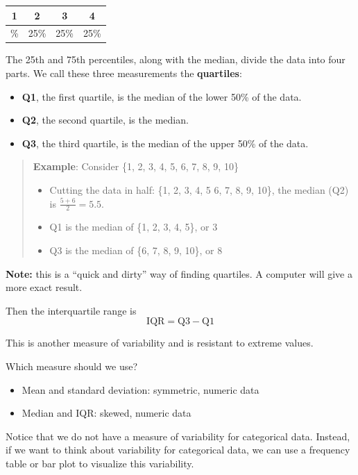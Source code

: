 \documentclass[
]{book}
\providecommand{\tightlist}{%
  \setlength{\itemsep}{0pt}\setlength{\parskip}{0pt}}
\begin{document}
\begin{longtable}[]{@{}cccc@{}}
\toprule\noalign{}
1 & 2 & 3 & 4 \\
\midrule\noalign{}
\endhead
\bottomrule\noalign{}
\endlastfoot
25\% & 25\% & 25\% & 25\% \\
\end{longtable}

The 25th and 75th percentiles, along with the median, divide the data into four parts. We call these three measurements the \textbf{quartiles}:

\begin{itemize}
\tightlist
\item
  \textbf{Q1}, the first quartile, is the median of the lower 50\% of the data.
\item
  \textbf{Q2}, the second quartile, is the median.
\item
  \textbf{Q3}, the third quartile, is the median of the upper 50\% of the data.
\end{itemize}

\begin{quote}
\textbf{Example}: Consider \{1, 2, 3, 4, 5, 6, 7, 8, 9, 10\}

\begin{itemize}
\tightlist
\item
  Cutting the data in half: \{1, 2, 3, 4, 5 \textbar{} 6, 7, 8, 9, 10\}, the median (Q2) is \(\frac{5+6}{2}=5.5\).
\item
  Q1 is the median of \{1, 2, 3, 4, 5\}, or 3
\item
  Q3 is the median of \{6, 7, 8, 9, 10\}, or 8
\end{itemize}
\end{quote}

\textbf{Note:} this is a ``quick and dirty'' way of finding quartiles. A computer will give a more exact result.

Then the interquartile range is
\[
  \text{IQR} = \text{Q3}-\text{Q1}
\]

This is another measure of variability and is resistant to extreme values.

Which measure should we use?

\begin{itemize}
\tightlist
\item
  Mean and standard deviation: symmetric, numeric data
\item
  Median and IQR: skewed, numeric data
\end{itemize}

Notice that we do not have a measure of variability for categorical data. Instead, if we want to think about variability for categorical data, we can use a frequency table or bar plot to visualize this variability.
\end{document}
